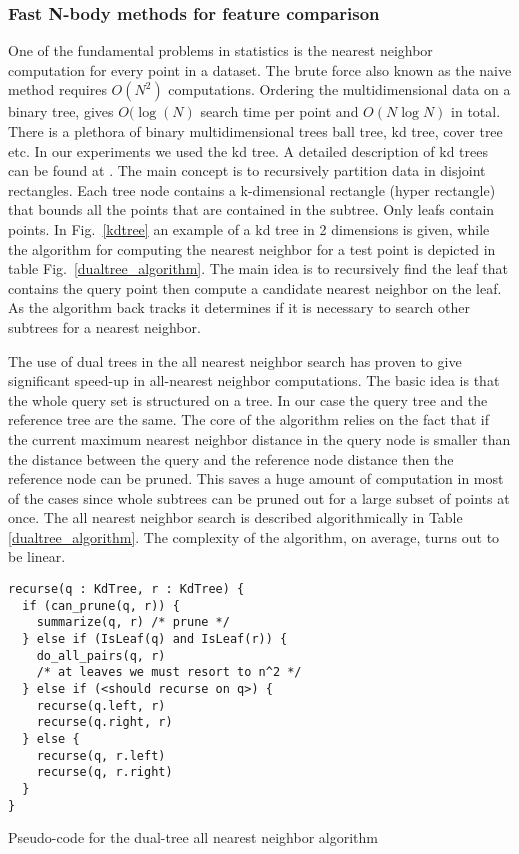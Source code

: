 \documentclass[12pt,letterpaper,doublespaced,ETD,dvips,proposal]{gtthesis}
\begin{document}
\begin{Body}
\subsubsection{Fast N-body methods for feature comparison} One of the
fundamental problems in statistics is the nearest neighbor
computation for every point in a dataset. The brute force also known
as the naive method requires $O(N^2)$ computations. Ordering the
multidimensional data on a binary tree, gives $O(\log (N)$ search
time per point and $O(N\log N)$ in total. There is a plethora of
binary multidimensional trees ball tree, kd tree, cover tree etc. In
our experiments we used the kd tree. A detailed description of kd
trees can be found at \cite{moore-tutorial}. The main concept is to
recursively partition data in disjoint rectangles. Each tree node
contains a k-dimensional rectangle (hyper rectangle) that bounds all
the points that are contained in the subtree. Only leafs contain
points. In Fig.~\ref{kdtree} an example of a kd tree in 2 dimensions
is given, while the algorithm for computing the nearest neighbor for
a test point is depicted in table Fig.~\ref{dualtree_algorithm}. The
main idea is to recursively find the leaf that contains the query
point then compute a candidate nearest neighbor on the leaf. As the
algorithm back tracks it determines if it is necessary to search
other subtrees for a nearest neighbor.

The use of dual trees in the all nearest neighbor search has proven
to give significant speed-up in all-nearest neighbor computations.
The basic idea is that the whole query set is structured on a tree.
In our case the query tree and the reference tree are the same. The
core of the algorithm relies on the fact that if the current maximum
nearest neighbor distance in the query node is smaller than the
distance between the query and the reference node distance then the
reference node can be pruned. This saves a huge amount of
computation in most of the cases since whole  subtrees can be pruned
out for a large subset of points at once. The all nearest neighbor
search is described algorithmically in Table
\ref{dualtree_algorithm}. The complexity of the algorithm, on
average, turns out to be linear.

\begin{table}
\begin{verbatim}
recurse(q : KdTree, r : KdTree) {
  if (can_prune(q, r)) {
    summarize(q, r) /* prune */
  } else if (IsLeaf(q) and IsLeaf(r)) {
    do_all_pairs(q, r)
    /* at leaves we must resort to n^2 */
  } else if (<should recurse on q>) {
    recurse(q.left, r)
    recurse(q.right, r)
  } else {
    recurse(q, r.left)
    recurse(q, r.right)
  }
}
\end{verbatim}
\caption{Pseudo-code for the dual-tree all nearest neighbor
algorithm} \label{dualtree_algorithm}
\end{table}




\end{Body}
\end{document}
